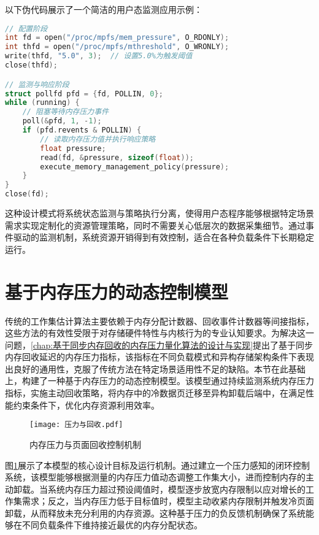 以下伪代码展示了一个简洁的用户态监测应用示例：

\begin{lstlisting}[language=C]
// 配置阶段
int fd = open("/proc/mpfs/mem_pressure", O_RDONLY);
int thfd = open("/proc/mpfs/mthreshold", O_WRONLY);
write(thfd, "5.0", 3);  // 设置5.0%为触发阈值
close(thfd);

// 监测与响应阶段
struct pollfd pfd = {fd, POLLIN, 0};
while (running) {
    // 阻塞等待内存压力事件
    poll(&pfd, 1, -1);
    if (pfd.revents & POLLIN) {
        // 读取内存压力值并执行响应策略
        float pressure;
        read(fd, &pressure, sizeof(float));
        execute_memory_management_policy(pressure);
    }
}
close(fd);
\end{lstlisting}

这种设计模式将系统状态监测与策略执行分离，使得用户态程序能够根据特定场景需求实现定制化的资源管理策略，同时不需要关心低层次的数据采集细节。通过事件驱动的监测机制，系统资源开销得到有效控制，适合在各种负载条件下长期稳定运行。

\section{基于内存压力的动态控制模型}
\label{sec:pressure_based_model}

传统的工作集估计算法主要依赖于内存分配计数器、回收事件计数器等间接指标，这些方法的有效性受限于对存储硬件特性与内核行为的专业认知要求。为解决这一问题，\ref{chap:基于同步内存回收的内存压力量化算法的设计与实现}提出了基于同步内存回收延迟的内存压力指标，该指标在不同负载模式和异构存储架构条件下表现出良好的通用性，克服了传统方法在特定场景适用性不足的缺陷。本节在此基础上，构建了一种基于内存压力的动态控制模型。该模型通过持续监测系统内存压力指标，实施主动回收策略，将内存中的冷数据页迁移至异构卸载后端中，在满足性能约束条件下，优化内存资源利用效率。

\begin{figure}[htb]
\centering
\texttt{[image: 压力与回收.pdf]}
\caption{内存压力与页面回收控制机制}
\label{fig:pressure_work_set}
\end{figure}

图\ref{fig:pressure_work_set}展示了本模型的核心设计目标及运行机制。通过建立一个压力感知的闭环控制系统，该模型能够根据测量的内存压力值动态调整工作集大小，进而控制内存的主动卸载。当系统内存压力超过预设阈值时，模型逐步放宽内存限制以应对增长的工作集需求；反之，当内存压力低于目标值时，模型主动收紧内存限制并触发冷页面卸载，从而释放未充分利用的内存资源。这种基于压力的负反馈机制确保了系统能够在不同负载条件下维持接近最优的内存分配状态。

